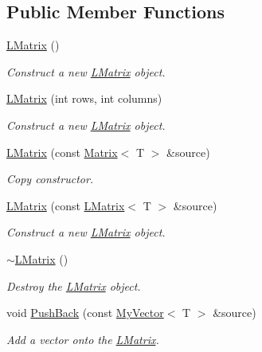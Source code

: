 \subsection*{Public Member Functions}
\begin{DoxyCompactItemize}
\item 
\mbox{\hyperlink{class_l_matrix_ae3c54a6ef307ad2e570db483b9fd9c03}{L\+Matrix}} ()
\begin{DoxyCompactList}\small\item\em Construct a new \mbox{\hyperlink{class_l_matrix}{L\+Matrix}} object. \end{DoxyCompactList}\item 
\mbox{\hyperlink{class_l_matrix_a5e031d95fcb4ce79894c52488d224f98}{L\+Matrix}} (int rows, int columns)
\begin{DoxyCompactList}\small\item\em Construct a new \mbox{\hyperlink{class_l_matrix}{L\+Matrix}} object. \end{DoxyCompactList}\item 
\mbox{\hyperlink{class_l_matrix_aa4bc8aa349207a09c467d958d7361b4b}{L\+Matrix}} (const \mbox{\hyperlink{class_matrix}{Matrix}}$<$ T $>$ \&source)
\begin{DoxyCompactList}\small\item\em Copy constructor. \end{DoxyCompactList}\item 
\mbox{\hyperlink{class_l_matrix_a0a4d56623c6c83d9fd2c3040e41429ae}{L\+Matrix}} (const \mbox{\hyperlink{class_l_matrix}{L\+Matrix}}$<$ T $>$ \&source)
\begin{DoxyCompactList}\small\item\em Construct a new \mbox{\hyperlink{class_l_matrix}{L\+Matrix}} object. \end{DoxyCompactList}\item 
\mbox{\hyperlink{class_l_matrix_ab4289f015b6b154b0f396550c1975250}{$\sim$\+L\+Matrix}} ()
\begin{DoxyCompactList}\small\item\em Destroy the \mbox{\hyperlink{class_l_matrix}{L\+Matrix}} object. \end{DoxyCompactList}\item 
void \mbox{\hyperlink{class_l_matrix_a3f82539f6b2251d49a2e39c7c359b92d}{Push\+Back}} (const \mbox{\hyperlink{class_my_vector}{My\+Vector}}$<$ T $>$ \&source)
\begin{DoxyCompactList}\small\item\em Add a vector onto the \mbox{\hyperlink{class_l_matrix}{L\+Matrix}}. \end{DoxyCompactList}\item 

\end{DoxyCompactItemize}

